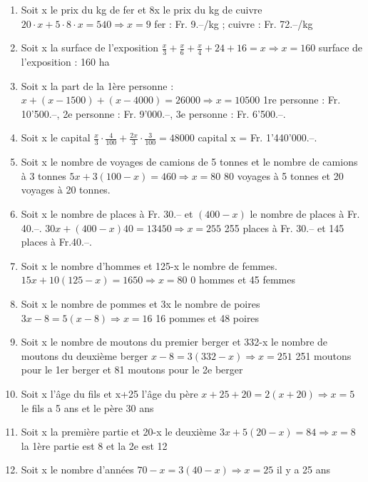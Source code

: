 \begin{solution} \hfill \vspace{-0.5cm}
\begin{enumerate}
\item Soit x le prix du kg de fer et 8x le prix du kg de cuivre
	$20\cdot x+5\cdot 8\cdot x=540\Rightarrow x=9$	fer : Fr. 9.–/kg ; cuivre : Fr. 72.–/kg
\item Soit x la surface de l'exposition $\frac{x}{3}+\frac{x}{6}+\frac{x}{4}+24+16=x\Rightarrow x=160$  
	surface de l'exposition : 160 ha
\item Soit x la part de la 1ère  personne : $x+(x-1500)+(x-4000)=26000\Rightarrow x=10500$
	1re personne : Fr. 10'500.–,   2e personne : Fr. 9'000.–, 3e personne : Fr. 6'500.–.
\item Soit x le capital $\frac{x}{3}\cdot \frac{4}{100}+\frac{2x}{3}\cdot \frac{3}{100}=48000$	capital x = Fr. 1'440'000.–.
\item Soit x le nombre de voyages de camions de 5 tonnes et le nombre de camions à 3 tonnes
	$5x+3(100-x)=460\Rightarrow x=80$	80 voyages à 5 tonnes et 20 voyages à 20 tonnes.
\item Soit x le nombre de places à Fr. 30.–  et $\left( 400-x \right)$  le nombre de places à Fr. 40.–.
	$30x+(400-x)40=13450\Rightarrow x=255$	255 places à Fr. 30.– et 145 places à Fr.40.–.
\item Soit x le nombre d’hommes et 125-x le nombre de femmes.
	$15x+10\left( 125-x \right)=1650\Rightarrow x=80$	0 hommes et 45 femmes
\item Soit x le nombre de pommes et 3x le nombre de poires
	$3x-8=5\left( x-8 \right)\Rightarrow x=16$	16 pommes et 48 poires
\item Soit x le nombre de moutons du premier berger et 332-x le nombre de moutons du deuxième berger
	$x-8=3\left( 332-x \right)\Rightarrow x=251$	251 moutons pour le 1er berger et 81 moutons pour le 2e berger
\item Soit x l’âge du fils et x+25 l’âge du père
	$x+25+20=2\left( x+20 \right)\Rightarrow x=5$	le fils a 5 ans et le père 30 ans
\item Soit x la première partie et 20-x le deuxième
	$3x+5\left( 20-x \right)=84\Rightarrow x=8$	la 1ère partie est 8 et la 2e est 12
\item Soit x le nombre d’années
	$70-x=3\left( 40-x \right)\Rightarrow x=25$	il y a 25 ans
\end{enumerate}
\end{solution}

